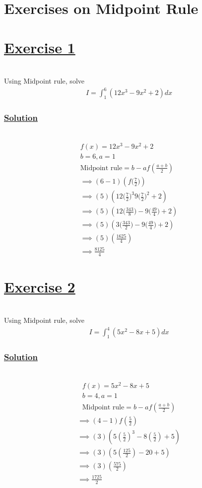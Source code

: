 \documentclass[12pt]{report}
\newcommand{\ubt}[1]{\textbf{\underline{#1}}}
\newcommand{\spn}[1]{\\[#1cm]}
\newcommand{\solution}{\subsubsection{\ubt{Solution}}{~}\spn{-1}}
\newcommand{\exercise}[1]{\section*{\ubt{Exercise #1}}{~}\spn{-1}}
\begin{document}
	\section{Exercises on Midpoint Rule}
	\exercise{1}
	Using Midpoint rule, solve
	\begin{eqnarray*}
		I = \int_1^6 (12x^3 - 9x^2 + 2) dx
	\end{eqnarray*}
	\solution
	\begin{gather*}
		f(x) = 12x^3 - 9x^2 + 2\\
		b=6, a=1\\
		\text{Midpoint rule} = b-af\left(\frac{a+b}{2}\right)\\
		\implies (6-1)\left(f\bigg(\frac{7}{2}\bigg)\right)\\
		\implies (5)\left(12\bigg(\frac{7}{2}\bigg)^3 9\bigg(\frac{7}{2}\bigg)^2 + 2\right)\\
		\implies (5)\left(12\bigg(\frac{343}{8}\bigg) - 9\bigg(\frac{49}{4}\bigg) + 2\right)\\
		\implies (5)\left( 3\bigg(\frac{343}{2}\bigg) - 9\bigg(\frac{49}{4}\bigg) + 2\right)\\
		\implies (5) \left(\frac{1625}{4}\right)\\
		\implies \frac{8125}{4}
	\end{gather*}
	
	\exercise{2}
	Using Midpoint rule, solve
	\begin{gather*}
		I=\int_1^4(5x^2-8x+5)dx
	\end{gather*}
	\solution
	\begin{gather*}
		f(x) = 5x^2 - 8x + 5\\
		b=4, a=1\\
		\text{Midpoint rule} = b-af\left(\frac{a+b}{2}\right)
	\end{gather*}
	\begin{gather*}
		\implies (4-1)f\left(\frac{5}{2}\right)\\
		\implies (3) \left( 5\left(\frac{5}{2}\right)^3 - 8\left(\frac{5}{2}\right) + 5\right)\\
		\implies (3)\left(5\left(\frac{125}{2}\right) - 20 + 5 \right)\\
		\implies (3) \left(\frac{575}{2}\right)\\
		\implies \frac{1725}{2}
	\end{gather*}
	
\end{document}
